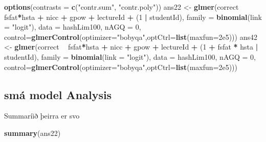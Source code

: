 \documentclass[
]{article}
\newenvironment{Shaded}{\begin{snugshade}}{\end{snugshade}}
\newcommand{\DataTypeTok}[1]{\textcolor[rgb]{0.13,0.29,0.53}{#1}}
\newcommand{\DecValTok}[1]{\textcolor[rgb]{0.00,0.00,0.81}{#1}}
\newcommand{\FloatTok}[1]{\textcolor[rgb]{0.00,0.00,0.81}{#1}}
\newcommand{\KeywordTok}[1]{\textcolor[rgb]{0.13,0.29,0.53}{\textbf{#1}}}
\newcommand{\NormalTok}[1]{#1}
\newcommand{\OperatorTok}[1]{\textcolor[rgb]{0.81,0.36,0.00}{\textbf{#1}}}
\newcommand{\StringTok}[1]{\textcolor[rgb]{0.31,0.60,0.02}{#1}}
\begin{document}
\begin{Shaded}
\begin{Highlighting}[]
\KeywordTok{options}\NormalTok{(}\DataTypeTok{contrasts =} \KeywordTok{c}\NormalTok{(}\StringTok{"contr.sum"}\NormalTok{, }\StringTok{"contr.poly"}\NormalTok{))}
\NormalTok{ans22 <-}\StringTok{ }\KeywordTok{glmer}\NormalTok{(correct }\OperatorTok{~}\StringTok{ }\NormalTok{fsfat}\OperatorTok{*}\NormalTok{hsta }\OperatorTok{+}\StringTok{ }\NormalTok{nicc }\OperatorTok{+}\StringTok{ }\NormalTok{gpow }\OperatorTok{+}\StringTok{ }\NormalTok{lectureId }\OperatorTok{+}\StringTok{ }\NormalTok{(}\DecValTok{1} \OperatorTok{|}\StringTok{ }\NormalTok{studentId), }\DataTypeTok{family =} \KeywordTok{binomial}\NormalTok{(}\DataTypeTok{link =} \StringTok{"logit"}\NormalTok{), }
               \DataTypeTok{data =}\NormalTok{ hashLim100, }\DataTypeTok{nAGQ =} \DecValTok{0}\NormalTok{, }\DataTypeTok{control=}\KeywordTok{glmerControl}\NormalTok{(}\DataTypeTok{optimizer=}\StringTok{"bobyqa"}\NormalTok{,}\DataTypeTok{optCtrl=}\KeywordTok{list}\NormalTok{(}\DataTypeTok{maxfun=}\FloatTok{2e5}\NormalTok{)))}
\NormalTok{ans42 <-}\StringTok{ }\KeywordTok{glmer}\NormalTok{(correct }\OperatorTok{~}\StringTok{ }\NormalTok{fsfat}\OperatorTok{*}\NormalTok{hsta }\OperatorTok{+}\StringTok{ }\NormalTok{nicc }\OperatorTok{+}\StringTok{ }\NormalTok{gpow }\OperatorTok{+}\StringTok{ }\NormalTok{lectureId }\OperatorTok{+}\StringTok{ }\NormalTok{(}\DecValTok{1} \OperatorTok{+}\StringTok{ }\NormalTok{fsfat }\OperatorTok{*}\StringTok{ }\NormalTok{hsta }\OperatorTok{|}\StringTok{ }\NormalTok{studentId), }
               \DataTypeTok{family =} \KeywordTok{binomial}\NormalTok{(}\DataTypeTok{link =} \StringTok{"logit"}\NormalTok{), }\DataTypeTok{data =}\NormalTok{ hashLim100, }\DataTypeTok{nAGQ =} \DecValTok{0}\NormalTok{,}
               \DataTypeTok{control=}\KeywordTok{glmerControl}\NormalTok{(}\DataTypeTok{optimizer=}\StringTok{"bobyqa"}\NormalTok{,}\DataTypeTok{optCtrl=}\KeywordTok{list}\NormalTok{(}\DataTypeTok{maxfun=}\FloatTok{2e5}\NormalTok{)))}
\end{Highlighting}
\end{Shaded}

\hypertarget{smuxe1-model-analysis}{%
\subsection{smá model Analysis}\label{smuxe1-model-analysis}}

Summaríið þeirra er svo

\begin{Shaded}
\begin{Highlighting}[]
\KeywordTok{summary}\NormalTok{(ans22)}
\end{Highlighting}
\end{Shaded}
\end{document}
